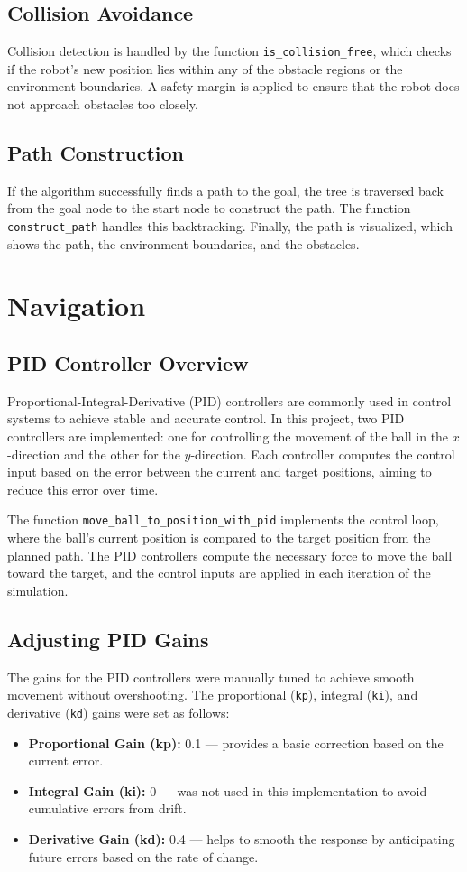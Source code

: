 \documentclass[12pt]{article}
\begin{document}
\subsection{Collision Avoidance}
Collision detection is handled by the function \texttt{is\_collision\_free}, which checks if the robot’s new position lies within any of the obstacle regions or the environment boundaries. A safety margin is applied to ensure that the robot does not approach obstacles too closely.

\subsection{Path Construction}
If the algorithm successfully finds a path to the goal, the tree is traversed back from the goal node to the start node to construct the path. The function \texttt{construct\_path} handles this backtracking. Finally, the path is visualized, which shows the path, the environment boundaries, and the obstacles.

\section{Navigation}

\subsection{PID Controller Overview}
Proportional-Integral-Derivative (PID) controllers are commonly used in control systems to achieve stable and accurate control. In this project, two PID controllers are implemented: one for controlling the movement of the ball in the $x$-direction and the other for the $y$-direction. Each controller computes the control input based on the error between the current and target positions, aiming to reduce this error over time.

The function \texttt{move\_ball\_to\_position\_with\_pid} implements the control loop, where the ball’s current position is compared to the target position from the planned path. The PID controllers compute the necessary force to move the ball toward the target, and the control inputs are applied in each iteration of the simulation.

\subsection{Adjusting PID Gains}
The gains for the PID controllers were manually tuned to achieve smooth movement without overshooting. The proportional (\texttt{kp}), integral (\texttt{ki}), and derivative (\texttt{kd}) gains were set as follows:
\begin{itemize}
    \item \textbf{Proportional Gain (kp):} 0.1 — provides a basic correction based on the current error.
    \item \textbf{Integral Gain (ki):} 0 — was not used in this implementation to avoid cumulative errors from drift.
    \item \textbf{Derivative Gain (kd):} 0.4 — helps to smooth the response by anticipating future errors based on the rate of change.
\end{itemize}
\end{document}
